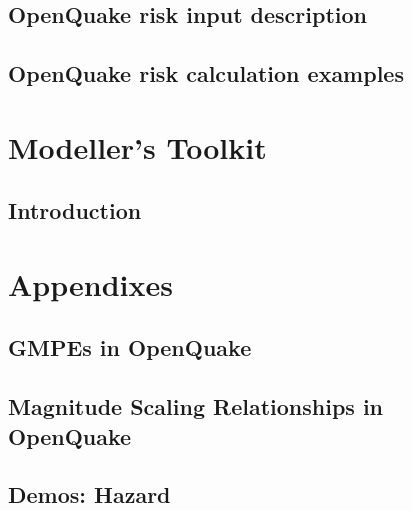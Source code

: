 \documentclass[12pt,a4paper,headings=small,version=first,dvips]{scrbook}
\begin{document}
\chapter{OpenQuake risk input description}
	\label{chap:riskinp}
	
\chapter{OpenQuake risk calculation examples}
	\label{chap:riskexamples}
	
\part{Modeller's Toolkit}
\chapter{Introduction}
	
\part{Appendixes}
\appendix
\chapter{GMPEs in OpenQuake}
	
\chapter{Magnitude Scaling Relationships in OpenQuake}
\chapter{Demos: Hazard}
%	
\end{document}
